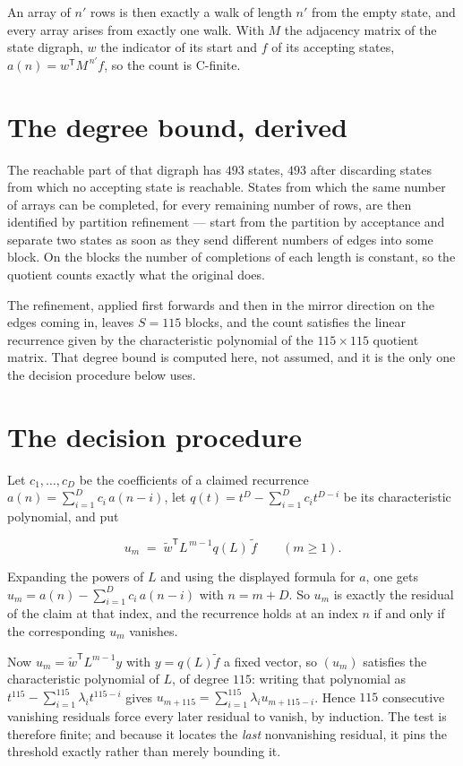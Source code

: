 \documentclass[11pt]{article}
\theoremstyle{definition}
\begin{document}
An array of $n'$ rows is then exactly a walk of length $n'$ from the empty state, and every array arises from exactly one walk. With $M$ the adjacency matrix of the state digraph, $w$ the indicator of its start and $f$ of its accepting states, $a(n) = w^{\mathsf T}M^{\,n'}f$, so the count is C-finite.

\section{The degree bound, derived}

The reachable part of that digraph has $493$ states, $493$ after discarding states from which no accepting state is reachable. States from which the same number of arrays can be completed, for every remaining number of rows, are then identified by partition refinement --- start from the partition by acceptance and separate two states as soon as they send different numbers of edges into some block. On the blocks the number of completions of each length is constant, so the quotient counts exactly what the original does.

The refinement, applied first forwards and then in the mirror direction on the edges coming in, leaves $S = 115$ blocks, and the count satisfies the linear recurrence given by the characteristic polynomial of the $115 \times 115$ quotient matrix. That degree bound is computed here, not assumed, and it is the only one the decision procedure below uses.

\section{The decision procedure}

Let $c_1,\dots,c_D$ be the coefficients of a claimed recurrence $a(n) = \sum_{i=1}^{D} c_i\,a(n-i)$, let $q(t) = t^{D} - \sum_{i=1}^{D} c_i t^{D-i}$ be its characteristic polynomial, and put

\[u_m \;=\; \tilde w^{\mathsf T} L^{\,m-1} q(L)\,\tilde f \qquad (m \ge 1).\]

Expanding the powers of $L$ and using the displayed formula for $a$, one gets $u_m = a(n) - \sum_{i=1}^{D} c_i\,a(n-i)$ with $n = m + D$. So $u_m$ is exactly the residual of the claim at that index, and the recurrence holds at an index $n$ if and only if the corresponding $u_m$ vanishes.

Now $u_m = \tilde w^{\mathsf T} L^{m-1} y$ with $y = q(L)\tilde f$ a fixed vector, so $(u_m)$ satisfies the characteristic polynomial of $L$, of degree $115$: writing that polynomial as $t^{115} - \sum_{i=1}^{115} \lambda_i t^{115-i}$ gives $u_{m+115} = \sum_{i=1}^{115} \lambda_i u_{m+115-i}$. Hence $115$ consecutive vanishing residuals force every later residual to vanish, by induction. The test is therefore finite; and because it locates the {\itshape last} nonvanishing residual, it pins the threshold exactly rather than merely bounding it.
\end{document}
